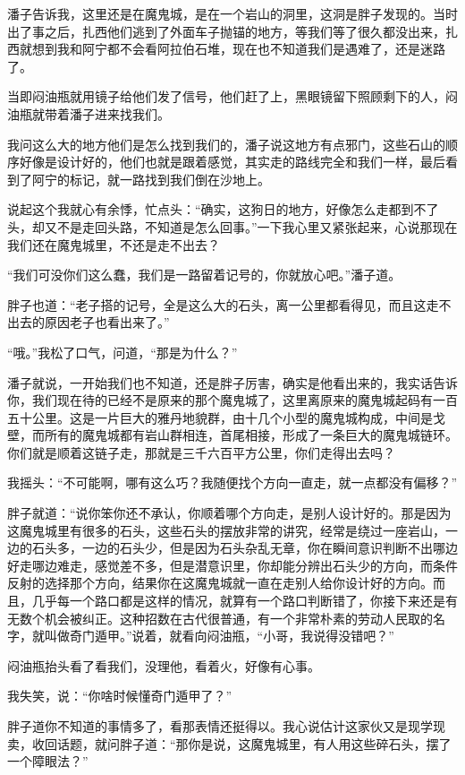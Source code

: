 潘子告诉我，这里还是在魔鬼城，是在一个岩山的洞里，这洞是胖子发现的。当时出了事之后，扎西他们逃到了外面车子抛锚的地方，等我们等了很久都没出来，扎西就想到我和阿宁都不会看阿拉伯石堆，现在也不知道我们是遇难了，还是迷路了。

当即闷油瓶就用镜子给他们发了信号，他们赶了上，黑眼镜留下照顾剩下的人，闷油瓶就带着潘子进来找我们。

我问这么大的地方他们是怎么找到我们的，潘子说这地方有点邪门，这些石山的顺序好像是设计好的，他们也就是跟着感觉，其实走的路线完全和我们一样，最后看到了阿宁的标记，就一路找到我们倒在沙地上。

说起这个我就心有余悸，忙点头：“确实，这狗日的地方，好像怎么走都到不了头，却又不是走回头路，不知道是怎么回事。”一下我心里又紧张起来，心说那现在我们还在魔鬼城里，不还是走不出去？

“我们可没你们这么蠢，我们是一路留着记号的，你就放心吧。”潘子道。

胖子也道：“老子搭的记号，全是这么大的石头，离一公里都看得见，而且这走不出去的原因老子也看出来了。”

“哦。”我松了口气，问道，“那是为什么？”

潘子就说，一开始我们也不知道，还是胖子厉害，确实是他看出来的，我实话告诉你，我们现在待的已经不是原来的那个魔鬼城了，这里离原来的魔鬼城起码有一百五十公里。这是一片巨大的雅丹地貌群，由十几个小型的魔鬼城构成，中间是戈壁，而所有的魔鬼城都有岩山群相连，首尾相接，形成了一条巨大的魔鬼城链环。你们就是顺着这链子走，那就是三千六百平方公里，你们走得出去吗？

我摇头：“不可能啊，哪有这么巧？我随便找个方向一直走，就一点都没有偏移？”

胖子就道：“说你笨你还不承认，你顺着哪个方向走，是别人设计好的。那是因为这魔鬼城里有很多的石头，这些石头的摆放非常的讲究，经常是绕过一座岩山，一边的石头多，一边的石头少，但是因为石头杂乱无章，你在瞬间意识判断不出哪边好走哪边难走，感觉差不多，但是潜意识里，你却能分辨出石头少的方向，而条件反射的选择那个方向，结果你在这魔鬼城就一直在走别人给你设计好的方向。而且，几乎每一个路口都是这样的情况，就算有一个路口判断错了，你接下来还是有无数个机会被纠正。这种招数在古代很普通，有一个非常朴素的劳动人民取的名字，就叫做奇门遁甲。”说着，就看向闷油瓶，“小哥，我说得没错吧？”

闷油瓶抬头看了看我们，没理他，看着火，好像有心事。

我失笑，说：“你啥时候懂奇门遁甲了？”

胖子道你不知道的事情多了，看那表情还挺得以。我心说估计这家伙又是现学现卖，收回话题，就问胖子道：“那你是说，这魔鬼城里，有人用这些碎石头，摆了一个障眼法？”

